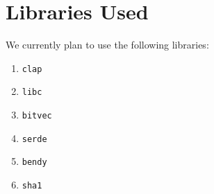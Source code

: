 \documentclass{article}
\begin{document}
    \clearpage
    \appendix
    \section{Libraries Used}

    We currently plan to use the following libraries:
    \begin{multicols}{2}
    \begin{enumerate}
        \item \verb|clap|
        \item \verb|libc|
        \item \verb|bitvec|
        \item \verb|serde|
        \item \verb|bendy|
        \item \verb|sha1|
    \end{enumerate}
    \end{multicols}
\end{document}
